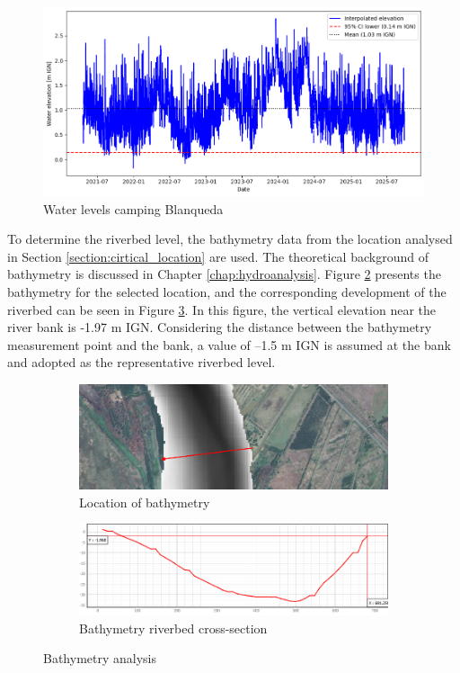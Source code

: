 \begin{figure}[H]
    \centering
    \includegraphics[width=0.60\linewidth]{figures/ch8/waterlevel_camping blanqueda.png}
    \caption{Water levels camping Blanqueda}
    \label{fig:water_levels_camping}
\end{figure}

To determine the riverbed level, the bathymetry data from the location analysed in Section \ref{section:cirtical_location} are used. The theoretical background of bathymetry is discussed in Chapter \ref{chap:hydroanalysis}. Figure \ref{fig:bath} presents the bathymetry for the selected location, and the corresponding development of the riverbed can be seen in Figure \ref{fig:bath2}. In this figure, the vertical elevation near the river bank is -1.97 m IGN. Considering the distance between the bathymetry measurement point and the bank, a value of –1.5 m IGN is assumed at the bank and adopted as the representative riverbed level.

\begin{figure}[H]
    \centering
    \begin{subfigure}{0.6\linewidth}
        \centering
        \includegraphics[width=\linewidth]{figures/ch8/bathemetry_1.png}
        \caption{Location of bathymetry}
        \label{fig:bath}
    \end{subfigure}

    \begin{subfigure}{0.6\linewidth}
        \centering
        \includegraphics[width=\linewidth]{figures/ch8/bathemetry_2.png}
        \caption{Bathymetry riverbed cross-section}
        \label{fig:bath2}
    \end{subfigure}

    \caption{Bathymetry analysis}
    \label{fig:bath_combined}
\end{figure}


